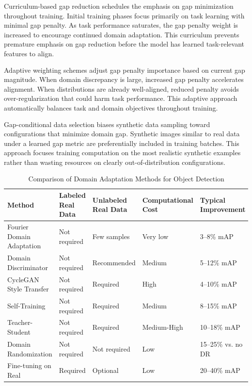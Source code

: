 Curriculum-based gap reduction schedules the emphasis on gap minimization throughout training. Initial training phases focus primarily on task learning with minimal gap penalty. As task performance saturates, the gap penalty weight is increased to encourage continued domain adaptation. This curriculum prevents premature emphasis on gap reduction before the model has learned task-relevant features to align.

Adaptive weighting schemes adjust gap penalty importance based on current gap magnitude. When domain discrepancy is large, increased gap penalty accelerates alignment. When distributions are already well-aligned, reduced penalty avoids over-regularization that could harm task performance. This adaptive approach automatically balances task and domain objectives throughout training.

Gap-conditional data selection biases synthetic data sampling toward configurations that minimize domain gap. Synthetic images similar to real data under a learned gap metric are preferentially included in training batches. This approach focuses training computation on the most realistic synthetic examples rather than wasting resources on clearly out-of-distribution configurations.

\begin{table}[htbp]
\centering
\caption{Comparison of Domain Adaptation Methods for Object Detection}
\label{tab:da_methods}
\begin{tabular}{p{3cm}p{2.5cm}p{2.5cm}p{2.5cm}p{3cm}}
\toprule
\textbf{Method} & \textbf{Labeled Real Data} & \textbf{Unlabeled Real Data} & \textbf{Computational Cost} & \textbf{Typical Improvement} \\
\midrule
Fourier Domain Adaptation & Not required & Few samples & Very low & 3--8\% mAP \\
\addlinespace
Domain Discriminator & Not required & Recommended & Medium & 5--12\% mAP \\
\addlinespace
CycleGAN Style Transfer & Not required & Required & High & 4--10\% mAP \\
\addlinespace
Self-Training & Not required & Required & Medium & 8--15\% mAP \\
\addlinespace
Teacher-Student & Not required & Required & Medium-High & 10--18\% mAP \\
\addlinespace
Domain Randomization & Not required & Not required & Low & 15--25\% vs. no DR \\
\addlinespace
Fine-tuning on Real & Required & Optional & Low & 20--40\% mAP \\
\bottomrule
\end{tabular}
\end{table}

